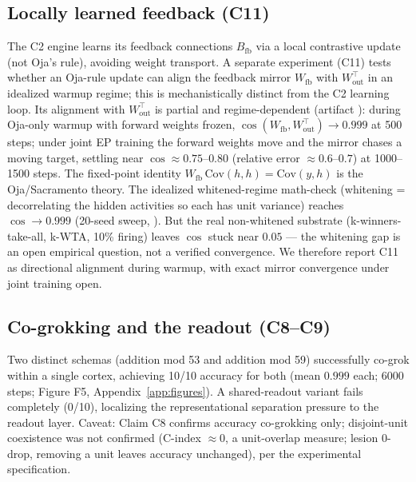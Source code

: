 \documentclass[11pt]{article}
\begin{document}
\subsection{Locally learned feedback (C11)}\label{sec:nowt}
The C2 engine learns its feedback connections $B_{\mathrm{fb}}$ via a local contrastive update (not Oja's rule), avoiding weight transport. A separate experiment (C11) tests whether an Oja-rule update \cite{oja1982} can align the feedback mirror $W_{\mathrm{fb}}$ with $W_{\mathrm{out}}^\top$ in an idealized warmup regime; this is mechanistically distinct from the C2 learning loop. Its alignment with $W_{\mathrm{out}}^{\top}$ is partial and regime-dependent (artifact \texttt{}): during Oja-only warmup with forward weights frozen, $\cos(W_{\mathrm{fb}}, W_{\mathrm{out}}^{\top}) \to 0.999$ at 500 steps; under joint EP training the forward weights move and the mirror chases a moving target, settling near $\cos \approx 0.75$--$0.80$ (relative error $\approx 0.6$--$0.7$) at 1000--1500 steps. The fixed-point identity $W_{\mathrm{fb}}\,\mathrm{Cov}(h, h) = \mathrm{Cov}(y, h)$ is the Oja/Sacramento theory. The idealized whitened-regime math-check (whitening = decorrelating the hidden activities so each has unit variance) reaches $\cos \to 0.999$ (20-seed sweep, \texttt{}). But the real non-whitened substrate (k-winners-take-all, k-WTA, 10\% firing) leaves $\cos$ stuck near $0.05$ --- the whitening gap is an open empirical question, not a verified convergence. We therefore report C11 as directional alignment during warmup, with exact mirror convergence under joint training open.

\subsection{Co-grokking and the readout (C8--C9)}\label{sec:cogrok}
Two distinct schemas (addition mod 53 and addition mod 59) successfully co-grok within a single cortex, achieving 10/10 accuracy for both (mean $0.999$ each; 6000 steps; Figure F5, Appendix~\ref{app:figures}). A shared-readout variant fails completely (0/10), localizing the representational separation pressure to the readout layer. Caveat: Claim C8 confirms accuracy co-grokking only; disjoint-unit coexistence was not confirmed (C-index $\approx 0$, a unit-overlap measure; lesion 0-drop, removing a unit leaves accuracy unchanged), per the experimental specification.
\end{document}
